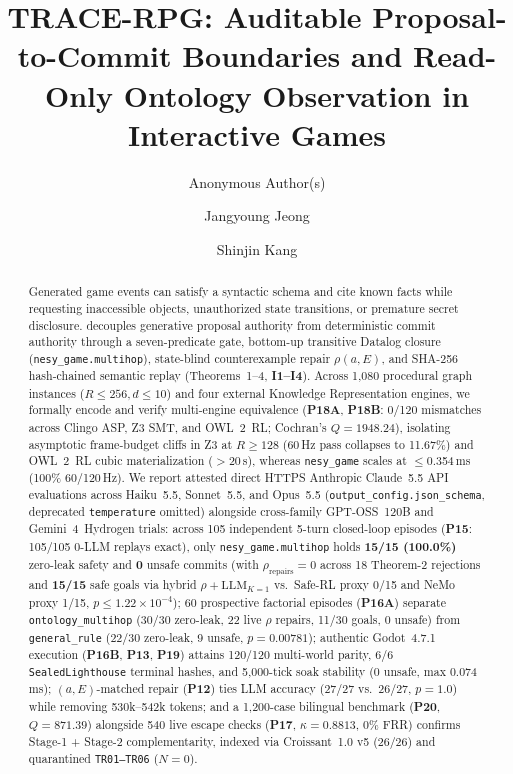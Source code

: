 \documentclass[final,5p,times,twocolumn]{elsarticle}
\begin{document}
\begin{frontmatter}

\title{TRACE-RPG: Auditable Proposal-to-Commit Boundaries and Read-Only Ontology Observation in Interactive Games}

\ifanonymoussubmission
\author{Anonymous Author(s)}
\else
\author[1]{Jangyoung Jeong}
\author[2]{Shinjin Kang}
\fi

\begin{abstract}
Generated game events can satisfy a syntactic schema and cite known facts while requesting inaccessible objects, unauthorized state transitions, or premature secret disclosure. \system{} decouples generative proposal authority from deterministic commit authority through a seven-predicate gate, bottom-up transitive Datalog closure (\texttt{nesy\_game.multihop}), state-blind counterexample repair $\rho(a,E)$, and SHA-256 hash-chained semantic replay (Theorems~1--4, \textbf{I1--I4}). Across 1,080 procedural graph instances ($R\le 256, d\le 10$) and four external Knowledge Representation engines, we formally encode and verify multi-engine equivalence (\textbf{P18A}, \textbf{P18B}: 0/120 mismatches across Clingo ASP, Z3 SMT, and OWL~2~RL; Cochran's $Q{=}1948.24$), isolating asymptotic frame-budget cliffs in Z3 at $R\ge 128$ (60\,Hz pass collapses to 11.67\%) and OWL~2~RL cubic materialization ($>$20\,s), whereas \texttt{nesy\_game} scales at $\le$0.354\,ms (100\% 60/120\,Hz). We report attested direct HTTPS Anthropic Claude~5.5 API evaluations across Haiku~5.5, Sonnet~5.5, and Opus~5.5 (\texttt{output\_config.json\_schema}, deprecated \texttt{temperature} omitted) alongside cross-family GPT-OSS~120B and Gemini~4~Hydrogen trials: across 105 independent 5-turn closed-loop episodes (\textbf{P15}: 105/105 0-LLM replays exact), only \texttt{nesy\_game.multihop} holds \textbf{15/15 (100.0\%)} zero-leak safety and \textbf{0} unsafe commits (with $\rho_{\mathrm{repairs}}{=}0$ across 18 Theorem-2 rejections and \textbf{15/15} safe goals via hybrid $\rho{+}\text{LLM}_{K=1}$ vs.\ Safe-RL proxy 0/15 and NeMo proxy 1/15, $p{\le}1.22{\times}10^{-4}$); 60 prospective factorial episodes (\textbf{P16A}) separate \texttt{ontology\_multihop} (30/30 zero-leak, 22 live $\rho$ repairs, 11/30 goals, 0 unsafe) from \texttt{general\_rule} (22/30 zero-leak, 9 unsafe, $p{=}0.00781$); authentic Godot~4.7.1 execution (\textbf{P16B}, \textbf{P13}, \textbf{P19}) attains 120/120 multi-world parity, 6/6 \texttt{SealedLighthouse} terminal hashes, and 5,000-tick soak stability (0 unsafe, max 0.074\,ms); $(a,E)$-matched repair (\textbf{P12}) ties LLM accuracy (27/27 vs.\ 26/27, $p{=}1.0$) while removing 530k--542k tokens; and a 1,200-case bilingual benchmark (\textbf{P20}, $Q{=}871.39$) alongside 540 live escape checks (\textbf{P17}, $\kappa{=}0.8813$, 0\% FRR) confirms Stage-1 + Stage-2 complementarity, indexed via Croissant~1.0 v5 (26/26) and quarantined \texttt{TR01--TR06} ($N{=}0$).
\end{abstract}


\end{frontmatter}
\end{document}

